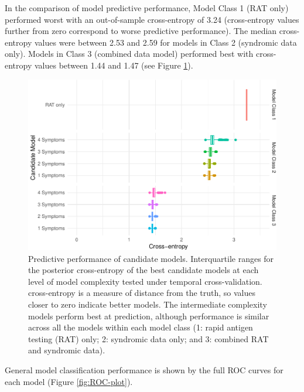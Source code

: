\documentclass[]{elsarticle} %
\begin{document}
In the comparison of model predictive performance, Model Class 1 (RAT only) performed worst with an out-of-sample cross-entropy of 3.24 (cross-entropy values further from zero correspond to worse predictive performance).
The median cross-entropy values were between 2.53 and 2.59 for models in Class 2 (syndromic data only).
Models in Class 3 (combined data model) performed best with cross-entropy values between 1.44 and 1.47 (see Figure \ref{fig:pred-perf}).

\begin{figure}
\centering
\includegraphics{0501_MainText_files/figure-latex/pred-perf-1.pdf}
\caption{\label{fig:pred-perf}Predictive performance of candidate models. Interquartile ranges for the posterior cross-entropy of the best candidate models at each level of model complexity tested under temporal cross-validation. cross-entropy is a measure of distance from the truth, so values closer to zero indicate better models. The intermediate complexity models perform best at prediction, although performance is similar across all the models within each model class (1: rapid antigen testing (RAT) only; 2: syndromic data only; and 3: combined RAT and syndromic data).}
\end{figure}

General model classification performance is shown by the full ROC curves for each model (Figure \ref{fig:ROC-plot}).
\end{document}
